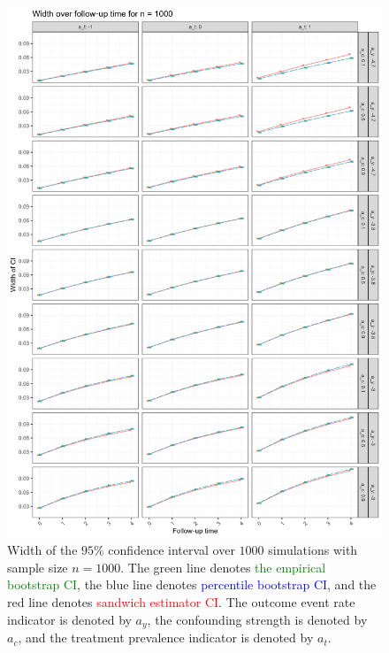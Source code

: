 \documentclass[pdflatex,sn-vancouver-ay]{sn-jnl}%
\theoremstyle{thmstyleone}%
\theoremstyle{thmstyletwo}%
\theoremstyle{thmstylethree}%
\begin{document}
\begin{appendices}
\begin{figure}[H]
\centering
\includegraphics[height=0.95\textheight]{plots/plots_width1000.png}
\caption{Width of the $95\%$ confidence interval over $1000$ simulations with sample size $n = 1000$. The green line denotes \textcolor{green}{the empirical bootstrap CI}, the blue line denotes \textcolor{blue}{percentile bootstrap CI}, and the red line denotes \textcolor{red}{sandwich estimator CI}. The outcome event rate indicator is denoted by $a_y$, the confounding strength is denoted by $a_c$, and the treatment prevalence indicator is denoted by $a_t$.}\label{plt:width1000}
\end{figure}

\newpage


\end{appendices}
\end{document}

